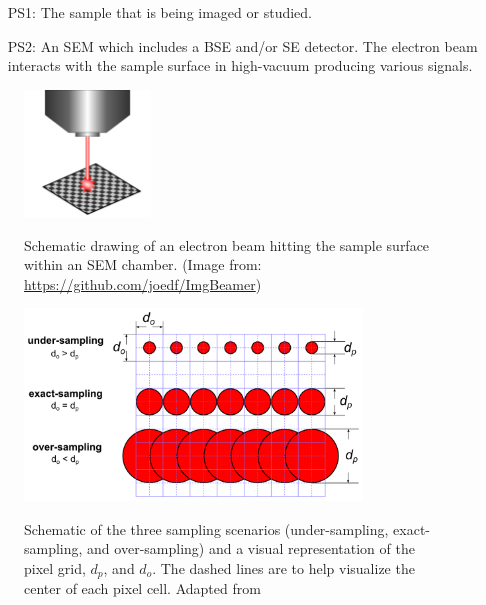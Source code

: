 \documentclass[12pt]{article}
\begin{document}
\begin{itemize}

\item[PS1:] The sample that is being imaged or studied.

\item[PS2:] An SEM which includes a BSE and/or SE detector. The electron beam interacts with the sample surface in high-vacuum producing various signals.

\end{itemize}
\setlength{\belowcaptionskip}{-30pt}
\begin{figure}[h!]
\begin{center}
{
 \includegraphics[width=0.3\textwidth]{figures/e_beam.png}
}
\caption{\label{fig_ebeam} Schematic drawing of an electron beam hitting the sample surface within an SEM chamber. (Image from: \url{https://github.com/joedf/ImgBeamer})}
\end{center}
\end{figure}

\begin{figure}[h!]
\begin{center}
{
 \includegraphics[width=0.8\textwidth]{figures/sampling.png}
}
\caption{\label{fig_sampling} Schematic of the three sampling scenarios (under-sampling, exact-sampling, and over-sampling) and a visual representation of the pixel grid, $d_p$, and $d_o$. The dashed lines are to help visualize the center of each pixel cell. Adapted from \citet{lifshin_improving_2014}}
\end{center}
\end{figure}
\end{document}
